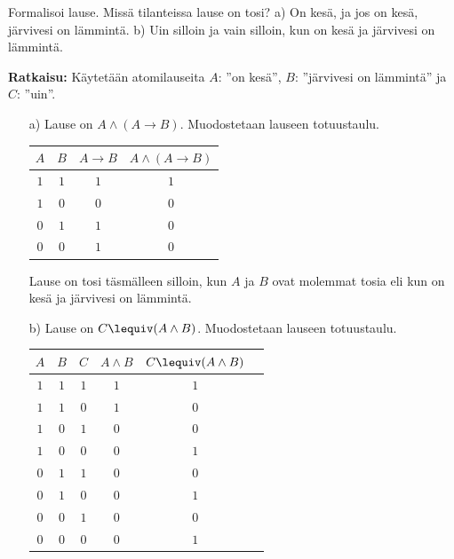 \begin{esimerkki}
Formalisoi lause. Missä tilanteissa lause on tosi? a) On kesä, ja jos on kesä, järvivesi on lämmintä. b) Uin silloin ja vain silloin, kun on kesä ja järvivesi on lämmintä. 

{\bf Ratkaisu:}
Käytetään atomilauseita $A$: ''on kesä'',
$B$: ''järvivesi on lämmintä'' ja $C$: ''uin''.
\begin{itemize}
\item[a)] Lause on $A \land (A \to B)$. Muodostetaan
lauseen totuustaulu.

\bigskip

\begin{center}
\begin{tabular}{|c|c|c|c|}\hline
$A$ & $B$ & $A \to B$ & $A \land (A \to B)$\\ \hline
$1$ & $1$ & $1$ & $1$\\ %
$1$ & $0$ & $0$ & $0$\\
$0$ & $1$ & $1$ & $0$\\
$0$ & $0$ & $1$ & $0$\\ \hline
\end{tabular}
\end{center}

\bigskip

Lause on tosi täsmälleen silloin, kun $A$ ja $B$ ovat
molemmat tosia eli kun on kesä ja järvivesi on lämmintä.
\item[b)] Lause on $C \lequiv (A \land B)$. Muodostetaan
lauseen totuustaulu.

\bigskip

\begin{center}
\begin{tabular}{|c|c|c|c|c|c|}\hline
$A$ & $B$ & $C$ & $A \land B$ & $C \lequiv (A \land B)$\\
\hline
$1$ & $1$ & $1$ & $1$ & $1$\\ %
$1$ & $1$ & $0$ & $1$ & $0$\\
$1$ & $0$ & $1$ & $0$ & $0$\\ %
$1$ & $0$ & $0$ & $0$ & $1$\\
$0$ & $1$ & $1$ & $0$ & $0$\\
$0$ & $1$ & $0$ & $0$ & $1$\\ %
$0$ & $0$ & $1$ & $0$ & $0$\\
$0$ & $0$ & $0$ & $0$ & $1$\\ \hline
\end{tabular}
\end{center}


\end{itemize}
\end{esimerkki}

